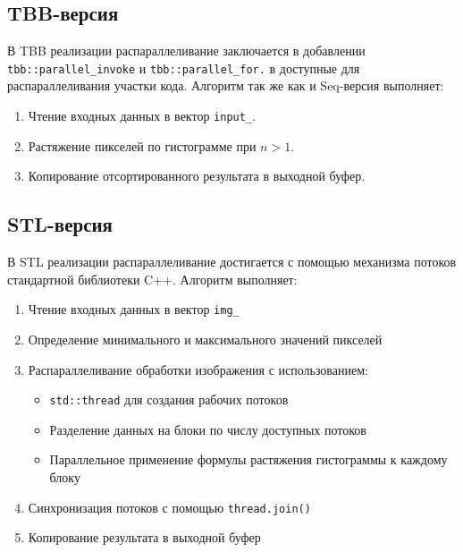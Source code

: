 \documentclass[a4paper,12pt]{article}
\begin{document}
\subsection{TBB-версия}
\hspace*{1.25em}В TBB реализации распараллеливание заключается в добавлении \texttt{tbb::parallel\_invoke} и \texttt{tbb::parallel\_for.} в доступные для распараллеливания участки кода. Алгоритм так же как и Seq-версия выполняет:
\begin{enumerate}
    \item Чтение входных данных в вектор \texttt{input\_}.
      \item Растяжение пикселей по гистограмме при $n>1$.
    \item Копирование отсортированного результата в выходной буфер.
\end{enumerate}
\subsection{STL-версия}
\hspace*{1.25em}В STL реализации распараллеливание достигается с помощью механизма потоков стандартной библиотеки C++. Алгоритм выполняет:
\begin{enumerate}
\item Чтение входных данных в вектор \texttt{img\_}
\item Определение минимального и максимального значений пикселей
\item Распараллеливание обработки изображения с использованием:
\begin{itemize}
\item \texttt{std::thread} для создания рабочих потоков
\item Разделение данных на блоки по числу доступных потоков
\item Параллельное применение формулы растяжения гистограммы к каждому блоку
\end{itemize}
\item Синхронизация потоков с помощью \texttt{thread.join()}
\item Копирование результата в выходной буфер
\end{enumerate}
\newpage
\end{document}
